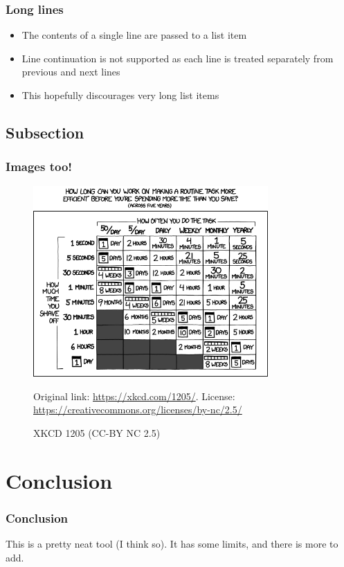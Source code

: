 \documentclass{beamer}
\begin{document}
\begin{frame}
\frametitle{Long lines}
\begin{itemize}
\item{The contents of a single line are passed to a list item}
\item{Line continuation is not supported as each line is treated separately from previous and next lines}
\item{This hopefully discourages very long list items}
\end{itemize}
\end{frame}

\subsection{Subsection}

\begin{frame}
\frametitle{Images too!}
\begin{figure}
\includegraphics[width=0.8\textwidth,height=0.6\textheight,keepaspectratio]{assets/is_it_worth_the_time.png}
\caption{XKCD 1205 (CC-BY NC 2.5)}
\label{figure0}
Original link: \url{https://xkcd.com/1205/}.
License: \url{https://creativecommons.org/licenses/by-nc/2.5/}
\end{figure}
\end{frame}

\section{Conclusion}

\begin{frame}
\frametitle{Conclusion}
This is a pretty neat tool (I think so).
It has some limits, and there is more to add.
\end{frame}
\end{document}
